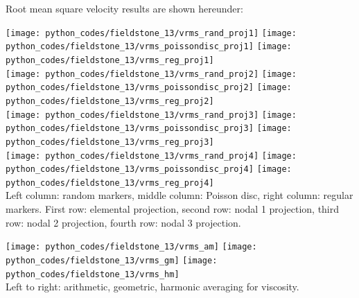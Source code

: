 \newpage
Root mean square velocity results are shown hereunder:
\begin{center}
\texttt{[image: python\_codes/fieldstone\_13/vrms\_rand\_proj1]} 
\texttt{[image: python\_codes/fieldstone\_13/vrms\_poissondisc\_proj1]} 
\texttt{[image: python\_codes/fieldstone\_13/vrms\_reg\_proj1]}\\ 
\texttt{[image: python\_codes/fieldstone\_13/vrms\_rand\_proj2]} 
\texttt{[image: python\_codes/fieldstone\_13/vrms\_poissondisc\_proj2]} 
\texttt{[image: python\_codes/fieldstone\_13/vrms\_reg\_proj2]}\\ 
\texttt{[image: python\_codes/fieldstone\_13/vrms\_rand\_proj3]} 
\texttt{[image: python\_codes/fieldstone\_13/vrms\_poissondisc\_proj3]} 
\texttt{[image: python\_codes/fieldstone\_13/vrms\_reg\_proj3]}\\
\texttt{[image: python\_codes/fieldstone\_13/vrms\_rand\_proj4]} 
\texttt{[image: python\_codes/fieldstone\_13/vrms\_poissondisc\_proj4]} 
\texttt{[image: python\_codes/fieldstone\_13/vrms\_reg\_proj4]}\\
{\captionfont Left column: random markers, middle column: Poisson disc, 
right column: regular markers.
First row: elemental projection, second row: nodal 1 projection, 
third row: nodal 2 projection, fourth row: nodal 3 projection. }
\end{center}

\begin{center}
\texttt{[image: python\_codes/fieldstone\_13/vrms\_am]} 
\texttt{[image: python\_codes/fieldstone\_13/vrms\_gm]} 
\texttt{[image: python\_codes/fieldstone\_13/vrms\_hm]}\\
{\captionfont Left to right: arithmetic, geometric, harmonic averaging for viscosity.}
\end{center}
